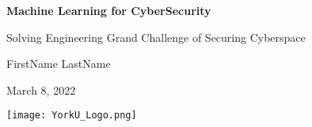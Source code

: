 \begin{titlepage}
    \begin{center}
        \vspace*{1cm}

        \Huge\textbf{Machine Learning for CyberSecurity}

        \vspace*{0.5cm}

        \LARGE Solving Engineering Grand Challenge of Securing Cyberspace

        \vspace*{1.0cm}

        \Large FirstName LastName

        \vspace*{1.0cm}

        \Large March 8, 2022

        \vfill

        \texttt{[image: YorkU\_Logo.png]}
    \end{center}
\end{titlepage}
\restoregeometry

